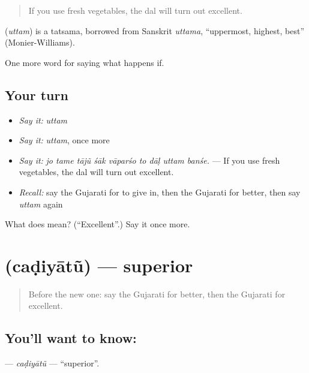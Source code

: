\begin{quote}
If you use fresh vegetables, the dal will turn out excellent.
\end{quote}

\begin{cousinweb}
\textbf{} (\emph{uttam}) is a tatsama, borrowed from Sanskrit \emph{uttama}, \textquotedblleft{}uppermost, highest, best\textquotedblright{} (Monier-Williams).
\end{cousinweb}

\begin{grammarlens}[title={What you've built}]
One more word for saying what happens if.
\end{grammarlens}

\subsection*{Your turn}
\begin{itemize}
\raggedright
  \item \emph{Say it:} \emph{uttam}
  \item \emph{Say it:} \emph{uttam}, once more
  \item \emph{Say it:} \emph{jo tame tājũ śāk vāparśo to dāḷ uttam banśe.} — If you use fresh vegetables, the dal will turn out excellent.
  \item \emph{Recall:} say the Gujarati for to give in, then the Gujarati for better, then say \emph{uttam} again
\end{itemize}

\begin{tcolorbox}[breakable,colback=teal!4,colframe=teal!35!black,title={Before you move on}]
What does  mean? (\textquotedblleft{}Excellent\textquotedblright{}.) Say it once more.
\end{tcolorbox}
\section[\texorpdfstring{\gu{ચડિયાતું} (caḍiyātũ)}{ચડિયાતું (caḍiyātũ)}]{ (caḍiyātũ) — superior}

\label{lesson:GU-C387-cadiyatu}



\begin{quote}
Before the new one: say the Gujarati for better, then the Gujarati for excellent.
\end{quote}

\subsection*{You'll want to know: }
\textbf{} — \emph{caḍiyātũ} — \textquotedblleft{}superior\textquotedblright{}.

